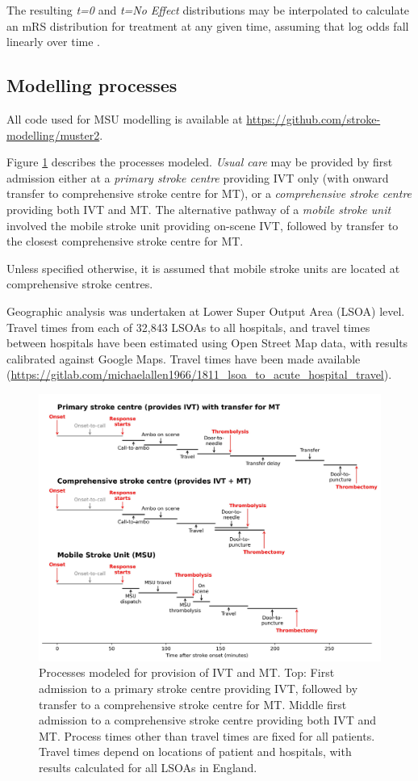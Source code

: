 The resulting \textit{t=0} and \textit{t=No Effect} distributions may be interpolated to calculate an mRS distribution for treatment at any given time, assuming that log odds fall linearly over time \cite{emberson_effect_2014, fransen_time_2016}. 

\subsection{Modelling processes}

All code used for MSU modelling is available at \url{https://github.com/stroke-modelling/muster2}.

Figure \ref{fig:process} describes the processes modeled. \textit{Usual care} may be provided by first admission either at a \textit{primary stroke centre} providing IVT only (with onward transfer to comprehensive stroke centre for MT), or a \textit{comprehensive stroke centre} providing both IVT and MT. The alternative pathway of a \textit{mobile stroke unit} involved the mobile stroke unit providing on-scene IVT, followed by transfer to the closest comprehensive stroke centre for MT.

Unless specified otherwise, it is assumed that mobile stroke units are located at comprehensive stroke centres.

Geographic analysis was undertaken at Lower Super Output Area (LSOA) level. Travel times from each of 32,843 LSOAs to all hospitals, and travel times between hospitals have been estimated using Open Street Map data, with results calibrated against Google Maps. Travel times have been made available (\url{https://gitlab.com/michaelallen1966/1811_lsoa_to_acute_hospital_travel}).

\begin{figure}[h]
    \centering
    \includegraphics[width=0.85\linewidth]{images/stroke_treatment.jpg}
    \caption{Processes modeled for provision of IVT and MT. Top: First admission to a primary stroke centre providing IVT, followed by transfer to a comprehensive stroke centre for MT. Middle first admission to a comprehensive stroke centre providing both IVT and MT. Process times other than travel times are fixed for all patients. Travel times depend on locations of patient and hospitals, with results calculated for all LSOAs in England.}
    \label{fig:process}
\end{figure}

